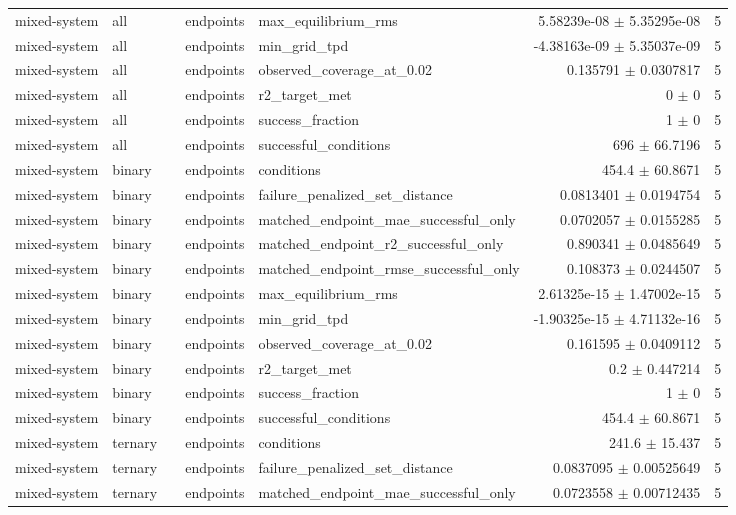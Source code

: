 \begin{tabular}{lllllrr}
mixed-system & all &  & endpoints & max_equilibrium_rms & 5.58239e-08 $\pm$ 5.35295e-08 & 5 \\
mixed-system & all &  & endpoints & min_grid_tpd & -4.38163e-09 $\pm$ 5.35037e-09 & 5 \\
mixed-system & all &  & endpoints & observed_coverage_at_0.02 & 0.135791 $\pm$ 0.0307817 & 5 \\
mixed-system & all &  & endpoints & r2_target_met & 0 $\pm$ 0 & 5 \\
mixed-system & all &  & endpoints & success_fraction & 1 $\pm$ 0 & 5 \\
mixed-system & all &  & endpoints & successful_conditions & 696 $\pm$ 66.7196 & 5 \\
mixed-system & binary &  & endpoints & conditions & 454.4 $\pm$ 60.8671 & 5 \\
mixed-system & binary &  & endpoints & failure_penalized_set_distance & 0.0813401 $\pm$ 0.0194754 & 5 \\
mixed-system & binary &  & endpoints & matched_endpoint_mae_successful_only & 0.0702057 $\pm$ 0.0155285 & 5 \\
mixed-system & binary &  & endpoints & matched_endpoint_r2_successful_only & 0.890341 $\pm$ 0.0485649 & 5 \\
mixed-system & binary &  & endpoints & matched_endpoint_rmse_successful_only & 0.108373 $\pm$ 0.0244507 & 5 \\
mixed-system & binary &  & endpoints & max_equilibrium_rms & 2.61325e-15 $\pm$ 1.47002e-15 & 5 \\
mixed-system & binary &  & endpoints & min_grid_tpd & -1.90325e-15 $\pm$ 4.71132e-16 & 5 \\
mixed-system & binary &  & endpoints & observed_coverage_at_0.02 & 0.161595 $\pm$ 0.0409112 & 5 \\
mixed-system & binary &  & endpoints & r2_target_met & 0.2 $\pm$ 0.447214 & 5 \\
mixed-system & binary &  & endpoints & success_fraction & 1 $\pm$ 0 & 5 \\
mixed-system & binary &  & endpoints & successful_conditions & 454.4 $\pm$ 60.8671 & 5 \\
mixed-system & ternary &  & endpoints & conditions & 241.6 $\pm$ 15.437 & 5 \\
mixed-system & ternary &  & endpoints & failure_penalized_set_distance & 0.0837095 $\pm$ 0.00525649 & 5 \\
mixed-system & ternary &  & endpoints & matched_endpoint_mae_successful_only & 0.0723558 $\pm$ 0.00712435 & 5 \\

\end{tabular}
